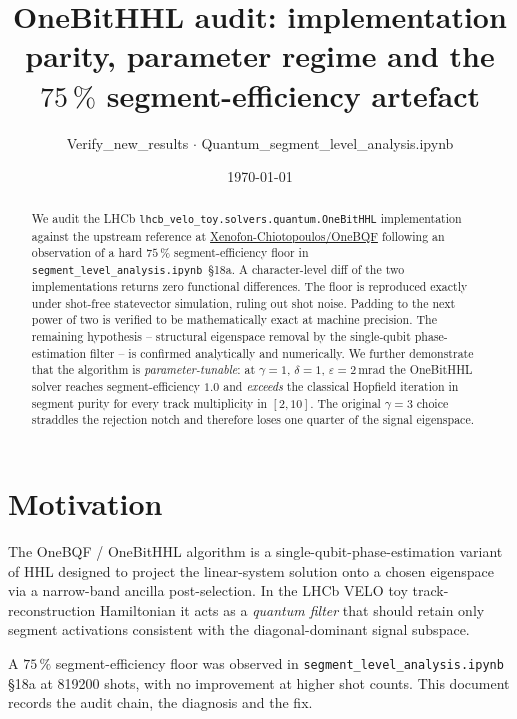 \documentclass[a4paper,11pt]{article}
\title{OneBitHHL audit: implementation parity, parameter regime and the\\
  $75\,\%$ segment-efficiency artefact}
\author{Verify\_new\_results $\cdot$ Quantum\_segment\_level\_analysis.ipynb}
\date{\today}
\newcommand{\SI}[2]{#1\,#2}
\newcommand{\milli}{\mathrm{m}}
\newcommand{\radian}{\mathrm{rad}}
\newcommand{\num}[1]{#1}
\begin{document}
\maketitle

\begin{abstract}
We audit the LHCb \texttt{lhcb\_velo\_toy.solvers.quantum.OneBitHHL} implementation against
the upstream reference at \href{https://github.com/Xenofon-Chiotopoulos/OneBQF}{Xenofon-Chiotopoulos/OneBQF}
following an observation of a hard $75\,\%$ segment-efficiency floor in \texttt{segment\_level\_analysis.ipynb}~\S18a.
A character-level diff of the two implementations returns zero functional differences.
The floor is reproduced exactly under shot-free statevector simulation, ruling out shot
noise. Padding to the next power of two is verified to be mathematically exact at machine
precision. The remaining hypothesis -- structural eigenspace removal by the single-qubit
phase-estimation filter -- is confirmed analytically and numerically. We further demonstrate
that the algorithm is \emph{parameter-tunable}: at $\gamma{=}1$, $\delta{=}1$, $\varepsilon
{=}\SI{2}{\milli\radian}$ the OneBitHHL solver reaches segment-efficiency $1.0$ and
\emph{exceeds} the classical Hopfield iteration in segment purity for every track
multiplicity in $[2, 10]$. The original $\gamma{=}3$ choice straddles the rejection notch
and therefore loses one quarter of the signal eigenspace.
\end{abstract}

\section{Motivation}
The OneBQF / OneBitHHL algorithm \cite{onebqf} is a single-qubit-phase-estimation variant
of HHL designed to project the linear-system solution onto a chosen eigenspace via a
narrow-band ancilla post-selection. In the LHCb VELO toy track-reconstruction Hamiltonian
\cite{simpleham} it acts as a \emph{quantum filter} that should retain only segment
activations consistent with the diagonal-dominant signal subspace.

A $75\,\%$ segment-efficiency floor was observed in \texttt{segment\_level\_analysis.ipynb}
\S18a at \num{819200} shots, with no improvement at higher shot counts. This document
records the audit chain, the diagnosis and the fix.
\end{document}
